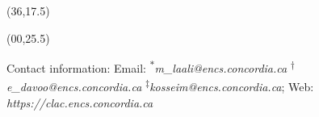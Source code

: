 \documentclass{article}
\renewcommand{\footnotesize}{\fontsize{17.28}{22}\selectfont}
\begin{document}
\begin{textblock}{10}(36,17.5)


\end{textblock}



\begin{textblock}{46}(00,25.5)
\begin{center}
{\footnotesize Contact information:
Email: \textsuperscript{$\ast$}\textit{m\_laali@encs.concordia.ca} \textsuperscript{$\dagger$}\textit{e\_davoo@encs.concordia.ca} \textsuperscript{$\ddagger$}\textit{kosseim@encs.concordia.ca}; 
Web: \textit{https://clac.encs.concordia.ca}
}
\vspace{-0.75\baselineskip}

\end{center}
\end{textblock}
\end{document}
